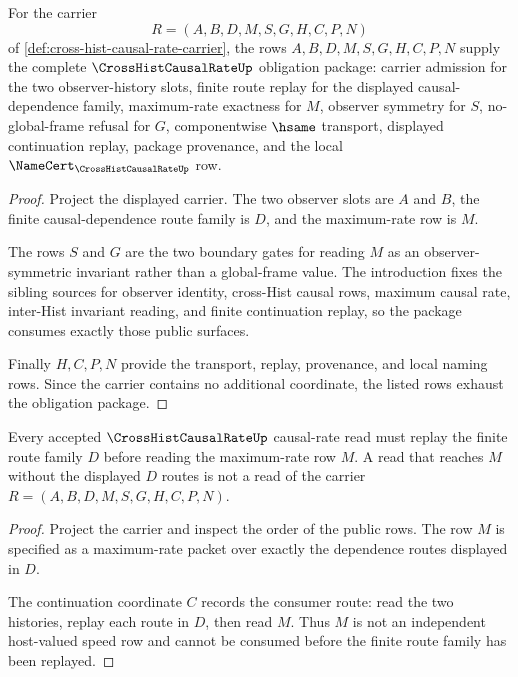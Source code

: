 \begin{theorem}
\label{thm:cross-hist-causal-rate-route-obligation-package}
For the carrier
$$
R=(A,B,D,M,S,G,H,C,P,N)
$$
of \autoref{def:cross-hist-causal-rate-carrier}, the rows $A,B,D,M,S,G,H,C,P,N$ supply the complete $\CrossHistCausalRateUp$ obligation package: carrier admission for the two observer-history slots, finite route replay for the displayed causal-dependence family, maximum-rate exactness for $M$, observer symmetry for $S$, no-global-frame refusal for $G$, componentwise $\hsame$ transport, displayed continuation replay, package provenance, and the local $\NameCert_{\CrossHistCausalRateUp}$ row.
\end{theorem}
\begin{proof}
Project the displayed carrier. The two observer slots are $A$ and $B$, the finite causal-dependence route family is $D$, and the maximum-rate row is $M$.

The rows $S$ and $G$ are the two boundary gates for reading $M$ as an observer-symmetric invariant rather than a global-frame value. The introduction fixes the sibling sources for observer identity, cross-Hist causal rows, maximum causal rate, inter-Hist invariant reading, and finite continuation replay, so the package consumes exactly those public surfaces.

Finally $H,C,P,N$ provide the transport, replay, provenance, and local naming rows. Since the carrier contains no additional coordinate, the listed rows exhaust the obligation package.
\end{proof}

\begin{theorem}
\label{thm:cross-hist-causal-rate-route-replay-obligation}
Every accepted $\CrossHistCausalRateUp$ causal-rate read must replay the finite route family $D$ before reading the maximum-rate row $M$. A read that reaches $M$ without the displayed $D$ routes is not a read of the carrier $R=(A,B,D,M,S,G,H,C,P,N)$.
\end{theorem}
\begin{proof}
Project the carrier and inspect the order of the public rows. The row $M$ is specified as a maximum-rate packet over exactly the dependence routes displayed in $D$.

The continuation coordinate $C$ records the consumer route: read the two histories, replay each route in $D$, then read $M$. Thus $M$ is not an independent host-valued speed row and cannot be consumed before the finite route family has been replayed.
\end{proof}

